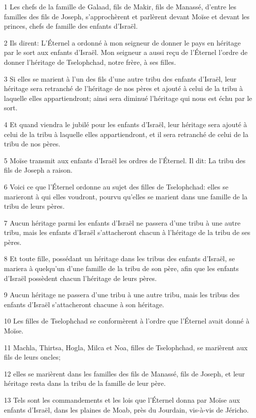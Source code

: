 \par 1 Les chefs de la famille de Galaad, fils de Makir, fils de Manassé, d'entre les familles des fils de Joseph, s'approchèrent et parlèrent devant Moïse et devant les princes, chefs de famille des enfants d'Israël.
\par 2 Ils dirent: L'Éternel a ordonné à mon seigneur de donner le pays en héritage par le sort aux enfants d'Israël. Mon seigneur a aussi reçu de l'Éternel l'ordre de donner l'héritage de Tselophchad, notre frère, à ses filles.
\par 3 Si elles se marient à l'un des fils d'une autre tribu des enfants d'Israël, leur héritage sera retranché de l'héritage de nos pères et ajouté à celui de la tribu à laquelle elles appartiendront; ainsi sera diminué l'héritage qui nous est échu par le sort.
\par 4 Et quand viendra le jubilé pour les enfants d'Israël, leur héritage sera ajouté à celui de la tribu à laquelle elles appartiendront, et il sera retranché de celui de la tribu de nos pères.
\par 5 Moïse transmit aux enfants d'Israël les ordres de l'Éternel. Il dit: La tribu des fils de Joseph a raison.
\par 6 Voici ce que l'Éternel ordonne au sujet des filles de Tselophchad: elles se marieront à qui elles voudront, pourvu qu'elles se marient dans une famille de la tribu de leurs pères.
\par 7 Aucun héritage parmi les enfants d'Israël ne passera d'une tribu à une autre tribu, mais les enfants d'Israël s'attacheront chacun à l'héritage de la tribu de ses pères.
\par 8 Et toute fille, possédant un héritage dans les tribus des enfants d'Israël, se mariera à quelqu'un d'une famille de la tribu de son père, afin que les enfants d'Israël possèdent chacun l'héritage de leurs pères.
\par 9 Aucun héritage ne passera d'une tribu à une autre tribu, mais les tribus des enfants d'Israël s'attacheront chacune à son héritage.
\par 10 Les filles de Tselophchad se conformèrent à l'ordre que l'Éternel avait donné à Moïse.
\par 11 Machla, Thirtsa, Hogla, Milca et Noa, filles de Tselophchad, se marièrent aux fils de leurs oncles;
\par 12 elles se marièrent dans les familles des fils de Manassé, fils de Joseph, et leur héritage resta dans la tribu de la famille de leur père.
\par 13 Tels sont les commandements et les lois que l'Éternel donna par Moïse aux enfants d'Israël, dans les plaines de Moab, près du Jourdain, vis-à-vis de Jéricho.


